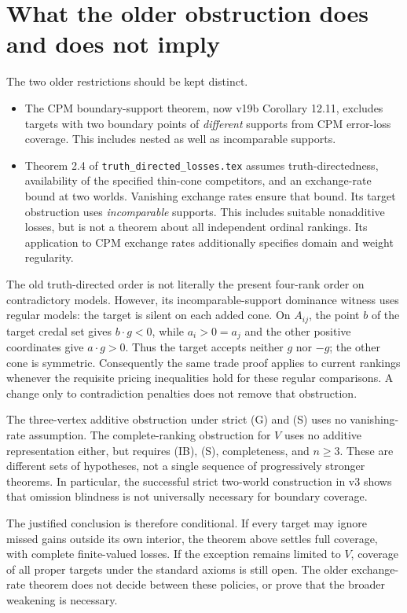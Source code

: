 \documentclass[11pt]{article}
\begin{document}
\section{What the older obstruction does and does not imply}

The two older restrictions should be kept distinct.
\begin{itemize}[leftmargin=*,itemsep=4pt]
\item The CPM boundary-support theorem, now v19b Corollary 12.11,
excludes targets with two boundary points of \emph{different} supports
from CPM error-loss coverage. This includes nested as well as
incomparable supports.
\item Theorem 2.4 of \texttt{truth\_directed\_losses.tex} assumes
truth-directedness, availability of the specified thin-cone competitors,
and an exchange-rate bound at two worlds. Vanishing exchange rates
ensure that bound. Its target obstruction uses \emph{incomparable}
supports. This includes suitable nonadditive losses, but is not a
theorem about all independent ordinal rankings. Its application to CPM
exchange rates additionally specifies domain and weight regularity.
\end{itemize}
The old truth-directed order is not literally the present four-rank
order on contradictory models. However, its incomparable-support
dominance witness uses regular models: the target is silent on each
added cone. On $A_{ij}$, the point $b$ of the target credal set gives
$b\cdot g<0$, while $a_i>0=a_j$ and the other positive coordinates give
$a\cdot g>0$. Thus the target accepts neither $g$ nor $-g$; the other
cone is symmetric. Consequently the same trade proof applies to current
rankings whenever the requisite pricing inequalities hold for these
regular comparisons. A change only to contradiction penalties does
not remove that obstruction.

The three-vertex additive obstruction under strict (G) and (S) uses no
vanishing-rate assumption. The complete-ranking obstruction for $V$
uses no additive representation either, but requires (IB), (S),
completeness, and $n\ge3$. These are different sets of hypotheses, not
a single sequence of progressively stronger theorems. In particular,
the successful strict two-world construction in v3 shows that omission
blindness is not universally necessary for boundary coverage.

The justified conclusion is therefore conditional. If every target may
ignore missed gains outside its own interior, the theorem above settles
full coverage, with complete finite-valued losses. If the exception
remains limited to $V$, coverage of all proper targets under the standard
axioms is still open. The older exchange-rate theorem does not decide
between these policies, or prove that the broader weakening is necessary.
\end{document}
